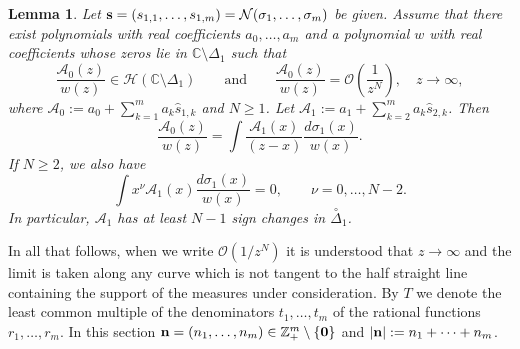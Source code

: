 \documentclass[10pt,a4paper]{article}
\newtheorem{lemma}[theorem]{Lemma}
\theoremstyle{definition}
\theoremstyle{remark}
\numberwithin{equation}{section}
\begin{document}
\begin{lemma}\label{psl}
Let ${\bf s} = (s_{1,1},\ldots,s_{1,m}) = \mathcal{N}(\sigma_1,\ldots,\sigma_m)$ be given. Assume that there exist polynomials with real coefficients $a_0,\ldots,a_m$ and a polynomial $w$ with real coefficients whose zeros lie in $\mathbb{C} \setminus \Delta_1$ such that
\[\frac{\mathcal{A}_0(z)}{w(z)} \in \mathcal{H}(\mathbb{C} \setminus \Delta_1)\qquad \mbox{and} \qquad \frac{\mathcal{A}_0(z)}{w(z)} = \mathcal{O}\left(\frac{1}{z^N}\right), \quad z \to \infty,
\]
where $\mathcal{A}_0  := a_0 + \sum_{k=1}^m a_k  \widehat{s}_{1,k} $ and $N \geq 1$. Let $\mathcal{A}_1  := a_1 + \sum_{k=2}^m a_k  \widehat{s}_{2,k} $. Then
\begin{equation} \label{eq:3}
\frac{\mathcal{A}_0(z)}{w(z)} = \int \frac{\mathcal{A}_1(x)}{(z-x)} \frac{d\sigma_1(x)}{w(x)}.
\end{equation}
If $N \geq 2$, we also have
\begin{equation} \label{eq:4}
\int x^{\nu}  \mathcal{A}_1(x)  \frac{d\sigma_1(x)}{w(x)} = 0, \qquad \nu = 0,\ldots, N -2.
\end{equation}
In particular, $\mathcal{A}_1$ has at least $N -1$ sign changes in  $\stackrel{\circ}{\Delta}_1 $.
\end{lemma}

In all that follows, when we write $\mathcal{O}(1/z^N)$ it is understood that $z \to \infty$ and the limit is taken  along any curve which is not tangent to the half straight line containing the support of the measures under consideration. By $T$ we denote the least common multiple of the denominators $t_1,\ldots,t_m$ of the rational functions $r_1,\ldots,r_m$. In this section ${\bf n} = (n_1,\ldots,n_m) \in \mathbb{Z}_+^m \setminus \{{\bf 0}\}$ and $|{\bf n}| := n_1 +\cdots+n_m$.
\end{document}
